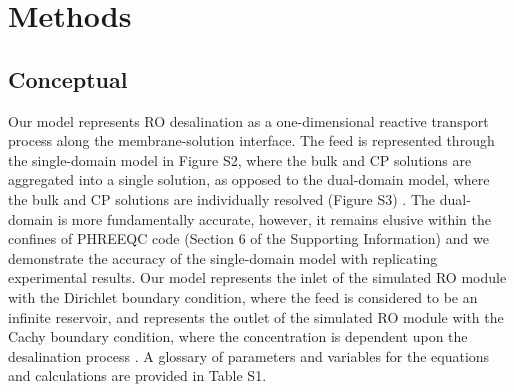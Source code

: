 \section{Methods}

\subsection{Conceptual}

Our model represents RO desalination as a one-dimensional reactive transport process along the membrane-solution interface. The feed is represented through the single-domain model in Figure S2, where the bulk and CP solutions are aggregated into a single solution, as opposed to the dual-domain model, where the bulk and CP solutions are individually resolved (Figure S3) \cite{Chen2016AssessingModel,Scruggs2019TheInterface,Greskowiak2015AUVI,Mieles2012AnalyticalSystem}. The dual-domain is more fundamentally accurate, however, it remains elusive within the confines of PHREEQC code (Section 6 of the Supporting Information) and we demonstrate the accuracy of the single-domain model with replicating experimental results. Our model represents the inlet of the simulated RO module with the Dirichlet boundary condition, where the feed is considered to be an infinite reservoir, and represents the outlet of the simulated RO module with the Cachy boundary condition, where the concentration is dependent upon the desalination process \cite{Gosses2018ExplicitModels,Moes2006ImposingMethod,Bazilevs2007WeakMechanics}. A glossary of parameters and variables for the equations and calculations are provided in Table S1.

